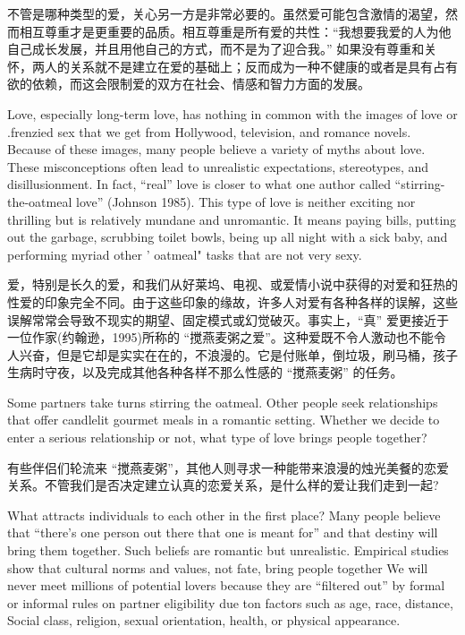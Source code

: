 \documentclass[cs4size, a4paper,12pt]{article}
\newcounter{numpar}
\newcommand*{\newpar}{\numpar{}}
\begin{document}
不管是哪种类型的爱，关心另一方是非常必要的。虽然爱可能包含激情的渴望，然而相互尊重才是更重要的品质。相互尊重是所有爱的共性：``我想要我爱的人为他自己成长发展，并且用他自己的方式，而不是为了迎合我。'' 如果没有尊重和关怀，两人的关系就不是建立在爱的基础上；反而成为一种不健康的或者是具有占有欲的依赖，而这会限制爱的双方在社会、情感和智力方面的发展。

\newpar Love, especially long-term love, has nothing in common with the images of love or .frenzied sex that we get from Hollywood, television, and romance novels. Because of these images, many people believe a variety of myths about love. These misconceptions often lead to unrealistic expectations, stereotypes, and disillusionment. In fact, ``real'' love is closer to what one author called ``stirring-the-oatmeal love'' (Johnson 1985). This type of love is neither exciting nor thrilling but is relatively mundane and unromantic. It means paying bills, putting out the garbage, scrubbing toilet bowls, being up all night with a sick baby, and performing myriad other ' oatmeal" tasks that are not very sexy.

爱，特别是长久的爱，和我们从好莱坞、电视、或爱情小说中获得的对爱和狂热的性爱的印象完全不同。由于这些印象的缘故，许多人对爱有各种各样的误解，这些误解常常会导致不现实的期望、固定模式或幻觉破灭。事实上，``真'' 爱更接近于一位作家(约翰逊，1995)所称的 ``搅燕麦粥之爱''。这种爱既不令人激动也不能令人兴奋，但是它却是实实在在的，不浪漫的。它是付账单，倒垃圾，刷马桶，孩子生病时守夜，以及完成其他各种各样不那么性感的 ``搅燕麦粥'' 的任务。

\newpar  Some partners take turns stirring the oatmeal. Other people seek relationships that offer candlelit gourmet meals in a romantic setting. Whether we decide to enter a serious relationship or not, what type of love brings people together?

有些伴侣们轮流来 ``搅燕麦粥''，其他人则寻求一种能带来浪漫的烛光美餐的恋爱关系。不管我们是否决定建立认真的恋爱关系，是什么样的爱让我们走到一起?

 \newpar What attracts individuals to each other in the first place? Many people believe that ``there's one person out there that one is meant for'' and that destiny will bring them together. Such beliefs are romantic but unrealistic. Empirical studies show that cultural norms and values, not fate, bring people together We will never meet millions of potential lovers because they are ``filtered out'' by formal or informal rules on partner
eligibility due ton factors such as age, race, distance, Social class, religion, sexual
orientation, health, or physical appearance.
\end{document}

